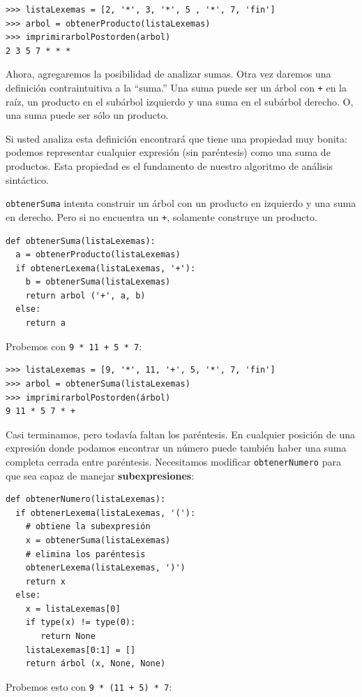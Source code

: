 \beforeverb
\begin{verbatim}
>>> listaLexemas = [2, '*', 3, '*', 5 , '*', 7, 'fin']
>>> arbol = obtenerProducto(listaLexemas)
>>> imprimirarbolPostorden(arbol)
2 3 5 7 * * *
\end{verbatim}
\afterverb
%
Ahora, agregaremos la posibilidad de analizar sumas. Otra vez
daremos una definición contraintuitiva a la  ``suma.'' Una suma
puede ser un árbol con \texttt{+} en la raíz, un producto en el
subárbol izquierdo y una suma en el subárbol derecho. O, una suma
puede ser sólo un producto.


Si usted analiza esta definición encontrará que tiene una propiedad
muy bonita: podemos representar cualquier expresión (sin paréntesis)
como una suma de productos. Esta propiedad es el fundamento de 
nuestro algoritmo de análisis sintáctico.

\texttt{obtenerSuma} intenta construir un árbol con un producto en
 izquierdo y una suma en derecho.  Pero si no encuentra un \texttt{+}, 
solamente construye un producto.

\beforeverb
\begin{verbatim}
def obtenerSuma(listaLexemas):
  a = obtenerProducto(listaLexemas)
  if obtenerLexema(listaLexemas, '+'):
    b = obtenerSuma(listaLexemas)
    return arbol ('+', a, b)
  else:
    return a
\end{verbatim}
\afterverb
%
Probemos con \texttt{9 * 11 + 5 * 7}:

\beforeverb
\begin{verbatim}
>>> listaLexemas = [9, '*', 11, '+', 5, '*', 7, 'fin']
>>> arbol = obtenerSuma(listaLexemas)
>>> imprimirarbolPostorden(árbol)
9 11 * 5 7 * +
\end{verbatim}
\afterverb
%
Casi terminamos, pero todavía faltan los paréntesis. En cualquier
posición de una expresión donde podamos encontrar un número puede
también haber una suma completa cerrada entre paréntesis. Necesitamos
modificar \texttt{obtenerNumero} para que sea capaz de manejar
{\bf subexpresiones}:


\beforeverb
\begin{verbatim}
def obtenerNumero(listaLexemas):
  if obtenerLexema(listaLexemas, '('):
    # obtiene la subexpresión
    x = obtenerSuma(listaLexemas)  
    # elimina los paréntesis
    obtenerLexema(listaLexemas, ')') 
    return x
  else:
    x = listaLexemas[0]
    if type(x) != type(0): 
       return None
    listaLexemas[0:1] = []
    return árbol (x, None, None)    
\end{verbatim}
\afterverb
%
Probemos esto con \texttt{9 * (11 + 5) * 7}:

